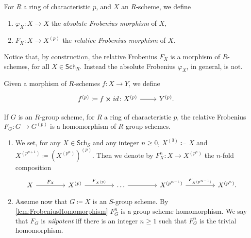 \documentclass[../Main]{subfiles}
\begin{document}
\begin{defn}
	For $R$ a ring of characteristic $p$, and $X$ an $R$-scheme, we define
\begin{enumerate}
	\item $\varphi_X\colon X \to X$ the {\em absolute Frobenius morphism} of $X$,
	\item $F_X \colon X \to X^{(p)}$ the {\em relative Frobenius morphism} of $X$.
\end{enumerate}
\end{defn}


\begin{rem}[]
	Notice that, by construction, the relative Frobenius $F_X$ is a
	morphism of $R$-schemes, for all $X \in \mathsf{Sch}_{ R }$.
	Instead the absolute Frobenius $\varphi_X$, in general, is not.
\end{rem}


\begin{ntt}
	Given a morphism of $R$-schemes $f\colon X \to Y$,
	we define 
	\begin{equation}
	\begin{tikzcd}[row sep = 0ex
		,/tikz/column 1/.append style={anchor=base east}
		,/tikz/column 2/.append style={anchor=base west}]
		f^{(p)} \coloneqq f \cross id\colon X^{(p)} \arrow[r, "", rightarrow] &
		Y^{(p)}
	.\end{tikzcd}
	\end{equation} 
\end{ntt}


\begin{lem}\label{lem:FrobeniusHomomorphism}
	If $G$ is an $R$-group scheme, for $R$ a ring of characteristic $p$,
	the relative Frobenius $F_G\colon G \to G^{(p)}$ is a 
	homomorphism of $R$-group schemes.
\end{lem} 


\begin{defn}\leavevmode\vspace{-1.2\baselineskip}\label{defn:nilpotentFrobenius}
\begin{enumerate}
\item We set, for any $X \in \mathsf{Sch}_{ S }$ and any integer $n \geq 0$,
	$X^{(0)} \coloneqq X$ and $X^{(p^{n+1})} \coloneqq \left( X^{(p^{n})} \right)^{(p)}$.
	Then we denote by $F^n_X\colon X \to X^{(p^n)}$
	the $n$-fold composition
	\begin{equation}
	\begin{tikzcd}[column sep=4.3em]
		X \arrow[r, "F_X", rightarrow] &
		X^{(p)} \arrow[r, "F_{X^{(p)}}", rightarrow] &
		\ldots \arrow[r, "", rightarrow] &
		X^{(p^{n-1})} \arrow[r, "F_{X^{(p^{n-1})}}", rightarrow] &
		X^{(p^n)}
	.\end{tikzcd}
	\end{equation}
\item Assume now that $G \coloneqq X$ is an $S$-group scheme. 
	By \cref{lem:FrobeniusHomomorphism} $F^n_G$ is a group scheme homomorphism.
	We say that $F_G$ is {\em nilpotent} iff there is an integer $n \geq 1$ such that
	$F^n_G$ is the trivial homomorphism.
\end{enumerate}
\end{defn}
\end{document}
